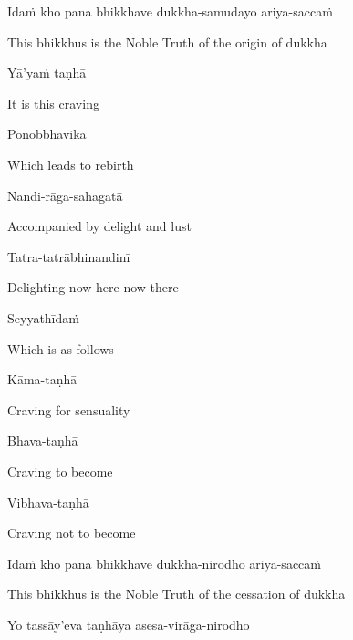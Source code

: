 Idaṁ kho pana bhikkhave dukkha-samudayo ariya-saccaṁ

\begin{cprenglish}
  This bhikkhus is the Noble Truth of the origin of dukkha
\end{cprenglish}

Yā’yaṁ taṇhā

\begin{cprenglish}
  It is this craving
\end{cprenglish}

Ponobbhavikā

\begin{cprenglish}
  Which leads to rebirth
\end{cprenglish}

Nandi-rāga-sahagatā

\begin{cprenglish}
  Accompanied by delight and lust
\end{cprenglish}

Tatra-tatrābhinandinī

\begin{cprenglish}
  Delighting now here now there
\end{cprenglish}

Seyyathīdaṁ

\begin{cprenglish}
  Which is as follows
\end{cprenglish}

Kāma-taṇhā

\begin{cprenglish}
  Craving for sensuality
\end{cprenglish}

Bhava-taṇhā

\begin{cprenglish}
  Craving to become
\end{cprenglish}

Vibhava-taṇhā

\begin{cprenglish}
  Craving not to become
\end{cprenglish}

Idaṁ kho pana bhikkhave dukkha-nirodho ariya-saccaṁ

\begin{cprenglish}
  This bhikkhus is the Noble Truth of the cessation of dukkha
\end{cprenglish}

Yo tassāy’eva taṇhāya asesa-virāga-nirodho

